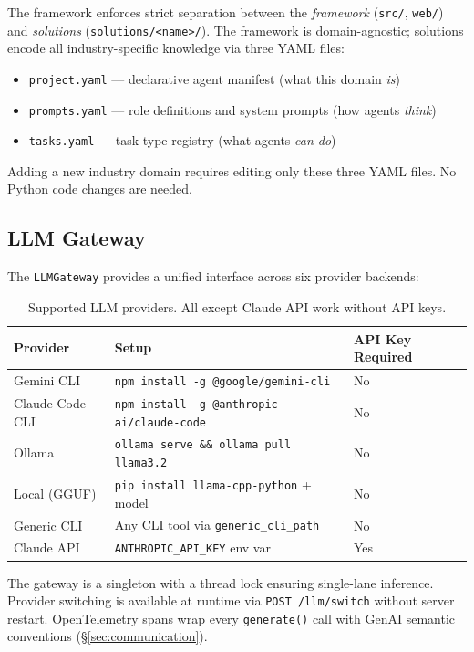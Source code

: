 \documentclass[11pt,a4paper]{article}
\begin{document}
The framework enforces strict separation between the \textit{framework} (\texttt{src/}, \texttt{web/}) and \textit{solutions} (\texttt{solutions/<name>/}). The framework is domain-agnostic; solutions encode all industry-specific knowledge via three YAML files:

\begin{itemize}[noitemsep]
    \item \texttt{project.yaml} --- declarative agent manifest (what this domain \textit{is})
    \item \texttt{prompts.yaml} --- role definitions and system prompts (how agents \textit{think})
    \item \texttt{tasks.yaml} --- task type registry (what agents \textit{can do})
\end{itemize}

Adding a new industry domain requires editing only these three YAML files. No Python code changes are needed.

\subsection{LLM Gateway}
\label{sec:llm}

The \texttt{LLMGateway} provides a unified interface across six provider backends:

\begin{table}[h]
\centering
\caption{Supported LLM providers. All except Claude API work without API keys.}
\label{tab:providers}
\begin{tabular}{lll}
\toprule
\textbf{Provider} & \textbf{Setup} & \textbf{API Key Required} \\
\midrule
Gemini CLI & \texttt{npm install -g @google/gemini-cli} & No \\
Claude Code CLI & \texttt{npm install -g @anthropic-ai/claude-code} & No \\
Ollama & \texttt{ollama serve \&\& ollama pull llama3.2} & No \\
Local (GGUF) & \texttt{pip install llama-cpp-python} + model & No \\
Generic CLI & Any CLI tool via \texttt{generic\_cli\_path} & No \\
Claude API & \texttt{ANTHROPIC\_API\_KEY} env var & Yes \\
\bottomrule
\end{tabular}
\end{table}

The gateway is a singleton with a thread lock ensuring single-lane inference. Provider switching is available at runtime via \texttt{POST /llm/switch} without server restart. OpenTelemetry spans wrap every \texttt{generate()} call with GenAI semantic conventions (\S\ref{sec:communication}).
\end{document}
